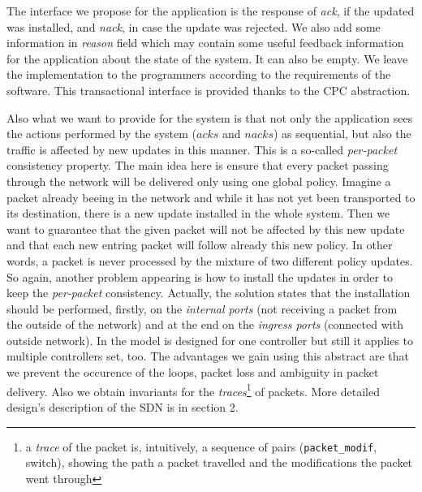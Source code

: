 \documentclass{article}
\theoremstyle{remark}
\begin{document}
The interface we propose for the application is the response of \emph{ack}, if the updated was installed, and \emph{nack}, in case the update was rejected. We also add some information in \emph{reason} field which may contain some useful feedback information for the application about the state of the system. It can also be empty. We leave the implementation to the programmers according to the requirements of the software. This transactional interface is provided thanks to the CPC abstraction.

Also what we want to provide for the system is that not only the application sees the actions performed by the system ($acks$ and $nacks$) as sequential, but also the traffic is affected by new updates in this manner. This is a so-called \emph{per-packet} consistency property\cite{Reitblatt:2012:ANU:2342356.2342427}. The main idea here is ensure that every packet passing through the network will be delivered only using one global policy. Imagine a packet already beeing in the network and while it has not yet been transported to its destination, there is a new update installed in the whole system. Then we want to guarantee that the given packet will not be affected by this new update and that each new entring packet will follow already this new policy. In other words, a packet is never processed by the mixture of two different policy updates.  
So again, another problem appearing is how to install the updates in order to keep the \emph{per-packet} consistency.
 Actually, the solution states that the installation should be performed, firstly, on the \emph{internal ports} (not receiving a packet from the outside of the network) and at the end on the \emph{ingress ports} (connected with outside network). In \cite{Reitblatt:2012:ANU:2342356.2342427} the model is designed for one controller but still it applies to multiple controllers set, too.
The advantages we gain using this abstract are that  we prevent the occurence of the loops, packet loss and ambiguity in packet delivery. 
Also we obtain invariants for the \emph{traces}\footnote{a \emph{trace} of the packet is, intuitively, a sequence of pairs (\texttt{packet\_modif}, switch), showing the path a packet travelled and the modifications the packet went through} of packets.
More detailed design's description of the SDN is in section 2. 
\end{document}
